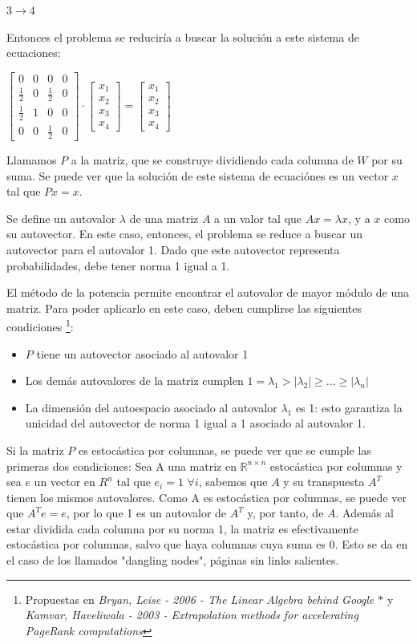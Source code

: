 \documentclass[a4paper]{article}
\begin{document}
$3 \rightarrow 4$

Entonces el problema se reduciría a buscar la solución a este sistema de ecuaciones:
\begin{center}
$\begin{bmatrix} 0&0&0&0\\\frac{1}{2}&0&\frac{1}{2}&0\\\frac{1}{2}&1&0&0\\0&0&\frac{1}{2}&0\end{bmatrix} \cdot \begin{bmatrix} x_1\\x_2\\x_3\\x_4 \end{bmatrix} = \begin{bmatrix} x_1\\x_2\\x_3\\x_4 \end{bmatrix}$
\end{center}
Llamamos $P$ a la matriz, que se construye dividiendo cada columna de $W$ por su suma. Se puede ver que la solución de este sistema de ecuaciónes es un vector $x$ tal que $Px=x$.

Se define un autovalor $\lambda$ de una matriz $A$ a un valor tal que $Ax=\lambda x$, y a $x$ como su autovector. En este caso, entonces, el problema se reduce a buscar un autovector para el autovalor 1. Dado que este autovector representa probabilidades, debe tener norma 1 igual a 1.

El método de la potencia permite encontrar el autovalor de mayor módulo de una matriz. Para poder aplicarlo en este caso, deben cumplirse las siguientes condiciones \footnote {Propuestas en \textit{Bryan, Leise - 2006 - The Linear Algebra behind Google $\ast$} y \textit{Kamvar, Haveliwala - 2003 - Extrapolation methods for accelerating PageRank computations}}:
\begin{itemize}
\item $P$ tiene un autovector asociado al autovalor 1
\item Los demás autovalores de la matriz cumplen $1 = \lambda_1 > |\lambda_2| \geq \dots \geq |\lambda_n|$ 
\item La dimensión del autoespacio asociado al autovalor $\lambda_1$ es 1: esto garantiza la unicidad del autovector de norma 1 igual a 1 asociado al autovalor 1.
\end{itemize}

Si la matriz $P$ es estocástica por columnas, se puede ver que se cumple las primeras dos condiciones:
Sea A una matriz en $\mathbb{R}^{n \times n}$ estocástica por columnas y sea $e$ un vector en $R^n$ tal que $e_i=1$ $\forall i$,
sabemos que $A$ y su transpuesta $A^T$ tienen los mismos autovalores. Como A es estocástica por columnas, se puede ver que $A^T e = e$, por lo que 1 es un autovalor de $A^T$ y, por tanto, de $A$. Además al estar dividida cada columna por su norma 1, la matriz es efectivamente estocástica por columnas, salvo que haya columnas cuya suma es 0. Esto se da en el caso de los llamados "dangling nodes", páginas sin links salientes. 
\end{document}

